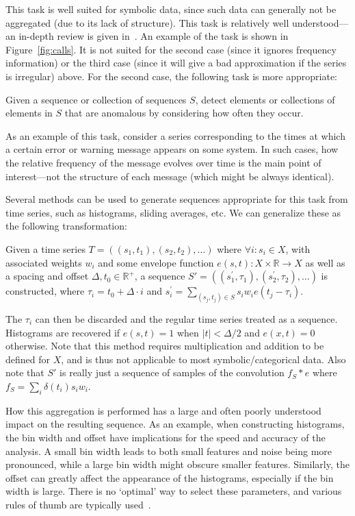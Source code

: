 This task is well suited for symbolic data, since such data can generally not be aggregated (due to its lack of structure). This task is relatively well understood---an in-depth review is given in~\cite{chandola2}. An example of the task is shown in Figure~\ref{fig:calls}. It is not suited for the second case (since it ignores frequency information) or the third case (since it will give a bad approximation if the series is irregular) above. For the second case, the following task is more appropriate:

\begin{task}
\label{task:frequential_anomaly_detection}
  Given a sequence or collection of sequences $S$, detect elements or collections of elements in $S$ that are anomalous by considering how often they occur.
\end{task}

As an example of this task, consider a series corresponding to the times at which a certain error or warning message appears on some system. In such cases, how the relative frequency of the message evolves over time is the main point of interest---not the structure of each message (which might be always identical).

Several methods can be used to generate sequences appropriate for this task from time series, such as histograms, sliding averages, etc. We can generalize these as the following transformation:

Given a time series $T = ((s_1, t_1), (s_2, t_2), \dots)$ where $\forall i: s_i \in X$, with associated weights $w_i$ and some envelope function $e(s, t): X \times \mathbb{R} \rightarrow X$ as well as a spacing and offset $\Delta, t_0 \in \mathbb{R}^+$, a sequence $S' = ((s_{1}^{'}, \tau_1), (s_{2}^{'}, \tau_2), \dots)$ is constructed, where $\tau_i = t_0 + \Delta \cdot i$ and $s_{i}^{'} = \sum_{(s_j, t_j) \in S} s_i w_i e(t_j - \tau_i)$.

The $\tau_i$ can then be discarded and the regular time series treated as a sequence. Histograms are recovered if $e(s, t) = 1$ when $|t| < \Delta/2$ and $e(x, t) = 0$ otherwise. Note that this method requires multiplication and addition to be defined for $X$, and is thus not applicable to most symbolic/categorical data. Also note that $S'$ is really just a sequence of samples of the convolution $f_S \ast e$ where $f_S = \sum_i \delta(t_i) s_i w_i$.

How this aggregation is performed has a large and often poorly understood impact on the resulting sequence. As an example, when constructing histograms, the bin width and offset have implications for the speed and accuracy of the analysis. A small bin width leads to both small features and noise being more pronounced, while a large bin width might obscure smaller features. Similarly, the offset can greatly affect the appearance of the histograms, especially if the bin width is large. There is no `optimal' way to select these parameters, and various rules of thumb are typically used~\cite{density_estimation}.

